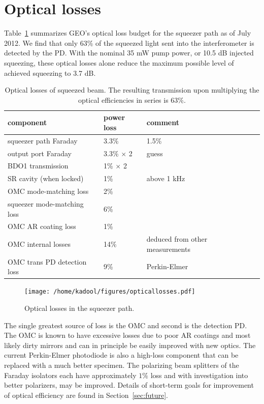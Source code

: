 \documentclass{ligodoc}
\begin{document}
\section{Optical losses}
Table~\ref{tab:losses} summarizes GEO's optical loss budget for the
squeezer path as of July 2012. We find that only 63\% of the squeezed
light sent into the interferometer is detected by the PD. With the
nominal 35 mW pump power, or 10.5 dB injected squeezing, these optical
losses alone reduce the maximum possible level of achieved squeezing
to 3.7 dB.

\begin{table}
\centering
\caption{Optical losses of squeezed beam. The resulting transmission
  upon multiplying the optical efficiencies in series is 63\%.}
\begin{tabular}{l l l l} %
\hline
component & power loss & comment \\
\hline
squeezer path Faraday & 3.3\% & 1.5\% \\
output port Faraday & 3.3\% $\times$ 2 & guess \\
BDO1 transmission & 1\% $\times$ 2 & \\
SR cavity (when locked) & 1\% & above 1 kHz \\
OMC mode-matching loss & 2\% & \\
squeezer mode-matching loss & 6\% & \\
OMC AR coating loss & 1\% & \\
OMC internal losses & 14\% & deduced from other measurements \\
OMC trans PD detection loss & 9\% & Perkin-Elmer \\
\hline
\end{tabular}
\label{tab:losses}
\end{table}

\begin{figure}
\begin{centering}
\texttt{[image: /home/kadool/figures/opticallosses.pdf]}
\caption{Optical losses in the squeezer path.}
\label{fig:powerbudget}
\end{centering}
\end{figure}

The single greatest source of loss is the OMC and second is the
detection PD. The OMC is known to have excessive losses due to poor AR
coatings and most likely dirty mirrors and can in principle be easily
improved with new optics. The current Perkin-Elmer photodiode is also
a high-loss component that can be replaced with a much better
specimen. The polarizing beam splitters of the Faraday isolators each
have approximately $1\%$ loss and with investigation into better
polarizers, may be improved. Details of short-term goals for
improvement of optical efficiency are found in
Section~\ref{sec:future}.
\end{document}
